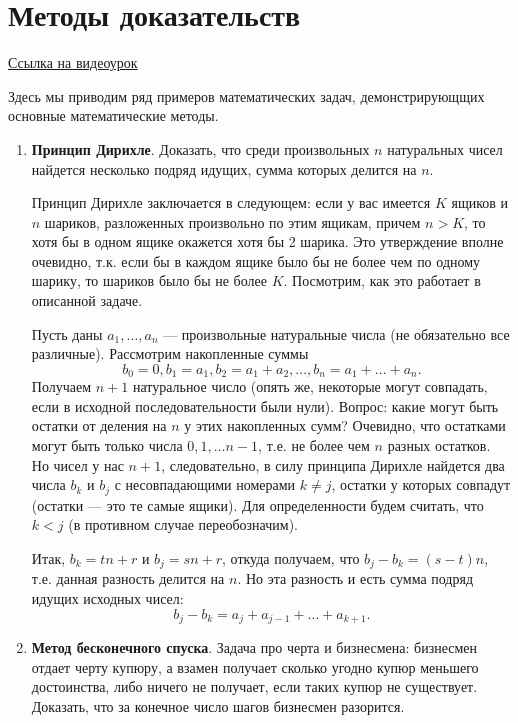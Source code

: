 \section{Методы доказательств}

\href{https://www.youtube.com/watch?v=vjJwmACdD_U}{Ссылка на видеоурок}

Здесь мы приводим ряд примеров математических задач, демонстрирующщих основные математические методы.

\begin{enumerate}
\item \textbf{Принцип Дирихле}. Доказать, что среди произвольных $n$ натуральных чисел найдется несколько подряд идущих, сумма которых делится на $n$.

Принцип Дирихле заключается в следующем: если у вас имеется $K$ ящиков и $n$ шариков, разложенных произвольно по этим ящикам,  причем $n>K$, то хотя бы в одном ящике окажется хотя бы 2 шарика. Это утверждение вполне очевидно, т.к. если бы в каждом ящике было бы не более чем по одному шарику, то шариков было бы не более $K$. Посмотрим, как это работает в описанной задаче.

Пусть даны $a_1,\dots,a_n$ --- произвольные натуральные числа (не обязательно все различные). Рассмотрим накопленные суммы
$$
b_0=0, b_1=a_1, b_2=a_1+a_2,\dots, b_n=a_1+\dots+a_n.
$$
Получаем $n+1$ натуральное число (опять же, некоторые могут совпадать, если в исходной последовательности были нули). Вопрос: какие могут быть остатки от деления на $n$ у этих накопленных сумм? Очевидно, что остатками могут быть только числа $0,1,\dots n-1$, т.е. не более чем $n$ разных остатков. Но чисел у нас $n+1$, следовательно, в силу принципа Дирихле найдется два числа $b_k$ и $b_j$ с несовпадающими номерами $k\ne j$, остатки у которых совпадут (остатки --- это те самые ящики). Для определенности будем считать, что $k<j$ (в противном случае переобозначим).

Итак, $b_k=tn+r$ и $b_j=sn+r$, откуда получаем, что $b_j-b_k=(s-t)n$, т.е. данная разность делится на $n$. Но эта разность и есть сумма подряд идущих исходных чисел:
$$
b_j-b_k=a_j+a_{j-1}+\dots+a_{k+1}.
$$


\item \textbf{Метод бесконечного спуска}. Задача про черта и бизнесмена: бизнесмен отдает черту купюру, а взамен получает сколько угодно купюр меньшего достоинства, либо ничего не получает, если таких купюр не существует. Доказать, что за конечное число шагов бизнесмен разорится.


\end{enumerate}

